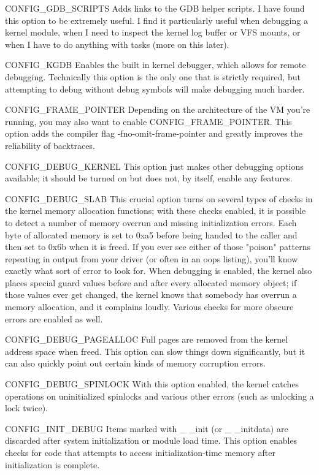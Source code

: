 \documentclass{masterthesis}
\begin{document}
CONFIG_GDB_SCRIPTS Adds links to the GDB helper scripts. I have found this option to be extremely useful. I find it particularly useful when debugging a kernel module, when I need to inspect the kernel log buffer or VFS mounts, or when I have to do anything with tasks (more on this later).

CONFIG_KGDB Enables the built in kernel debugger, which allows for remote debugging. Technically this option is the only one that is strictly required, but attempting to debug without debug symbols will make debugging much harder.

CONFIG_FRAME_POINTER Depending on the architecture of the VM you’re running, you may also want to enable CONFIG_FRAME_POINTER. This option adds the compiler flag -fno-omit-frame-pointer and greatly improves the reliability of backtraces.

CONFIG_DEBUG_KERNEL
This option just makes other debugging options available; it should be turned on but does not, by itself, enable any features.

CONFIG_DEBUG_SLAB
This crucial option turns on several types of checks in the kernel memory allocation functions; with these checks enabled, it is possible to detect a number of memory overrun and missing initialization errors. Each byte of allocated memory is set to 0xa5 before being handed to the caller and then set to 0x6b when it is freed. If you ever see either of those "poison" patterns repeating in output from your driver (or often in an oops listing), you'll know exactly what sort of error to look for. When debugging is enabled, the kernel also places special guard values before and after every allocated memory object; if those values ever get changed, the kernel knows that somebody has overrun a memory allocation, and it complains loudly. Various checks for more obscure errors are enabled as well.

CONFIG_DEBUG_PAGEALLOC
Full pages are removed from the kernel address space when freed. This option can slow things down significantly, but it can also quickly point out certain kinds of memory corruption errors.

CONFIG_DEBUG_SPINLOCK
With this option enabled, the kernel catches operations on uninitialized spinlocks and various other errors (such as unlocking a lock twice).

CONFIG_INIT_DEBUG
Items marked with _ _init (or _ _initdata) are discarded after system initialization or module load time. This option enables checks for code that attempts to access initialization-time memory after initialization is complete.
\end{document}
